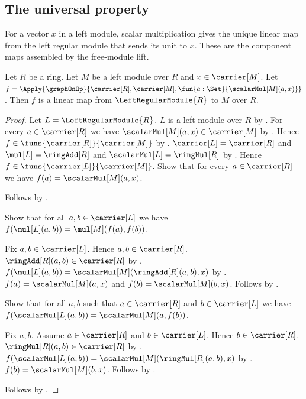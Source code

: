 \subsection{The universal property}

For a vector $x$ in a left module, scalar multiplication gives the unique
linear map from the left regular module that sends its unit to $x$.  These are
the component maps assembled by the free-module lift.

\begin{theorem}\label{left_regular_scalar_extension_linear}
    Let $R$ be a ring.
    Let $M$ be a left module over $R$ and $x\in\carrier[M]$.
    Let
        $f=\Apply{\graphOnOp}{
            \carrier[R],\carrier[M],
            \fun{a:\Set}{\scalarMul[M](a,x)}}$.
    Then $f$ is a linear map from $\LeftRegularModule{R}$ to $M$ over $R$.
\end{theorem}
\begin{proof}
    Let $L=\LeftRegularModule{R}$.
    $L$ is a left module over $R$ by
        .
    For every $a\in\carrier[R]$ we have
        $\scalarMul[M](a,x)\in\carrier[M]$ by
        .
    Hence $f\in\funs{\carrier[R]}{\carrier[M]}$ by
        .
    $\carrier[L]=\carrier[R]$ and
        $\mul[L]=\ringAdd[R]$ and
        $\scalarMul[L]=\ringMul[R]$ by
        .
    Hence $f\in\funs{\carrier[L]}{\carrier[M]}$.
    Show that for every $a\in\carrier[R]$ we have
        $f(a)=\scalarMul[M](a,x)$.
    \begin{subproof}
        Follows by .
    \end{subproof}
    Show that for all $a,b\in\carrier[L]$ we have
        $f(\mul[L](a,b))=\mul[M](f(a),f(b))$.
    \begin{subproof}
        Fix $a,b\in\carrier[L]$.
        Hence $a,b\in\carrier[R]$.
        $\ringAdd[R](a,b)\in\carrier[R]$ by .
        $f(\mul[L](a,b))
            =\scalarMul[M](\ringAdd[R](a,b),x)$ by \auto.
        $f(a)=\scalarMul[M](a,x)$ and
            $f(b)=\scalarMul[M](b,x)$.
        Follows by .
    \end{subproof}
    Show that for all $a,b$ such that $a\in\carrier[R]$ and
        $b\in\carrier[L]$ we have
        $f(\scalarMul[L](a,b))=\scalarMul[M](a,f(b))$.
    \begin{subproof}
        Fix $a,b$.
        Assume $a\in\carrier[R]$ and $b\in\carrier[L]$.
        Hence $b\in\carrier[R]$.
        $\ringMul[R](a,b)\in\carrier[R]$ by .
        $f(\scalarMul[L](a,b))
            =\scalarMul[M](\ringMul[R](a,b),x)$ by \auto.
        $f(b)=\scalarMul[M](b,x)$.
        Follows by .
    \end{subproof}
    Follows by .
\end{proof}

